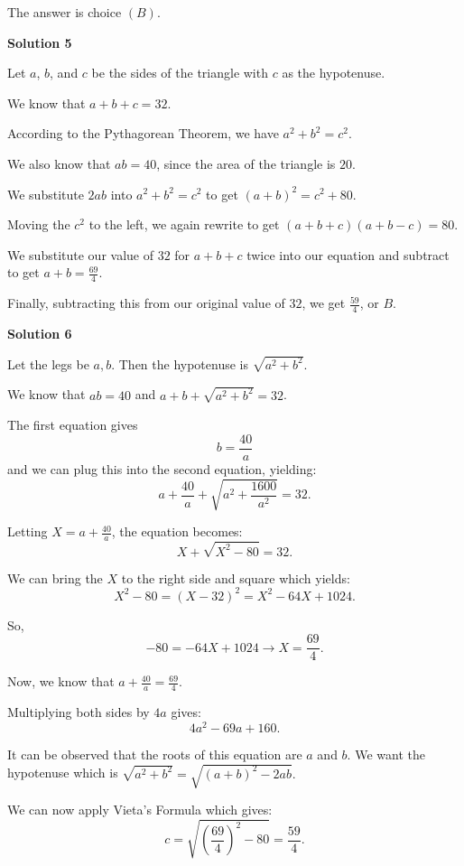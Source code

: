 \begin{enumerate}
 The answer is choice $(B)$.

 



\textbf{Solution 5}

Let $a$, $b$, and $c$ be the sides of the triangle with $c$ as the hypotenuse.

 We know that $a + b + c =32$.

 According to the Pythagorean Theorem, we have $a^2 + b^2 = c^2$.

 We also know that $ab = 40$, since the area of the triangle is $20$.

 We substitute $2ab$ into $a^2 + b^2 = c^2$ to get $(a+b)^2 = c^2 + 80$.

 Moving the $c^2$ to the left, we again rewrite to get $(a+b+c)(a+b-c) = 80$.

 We substitute our value of $32$ for $a+b+c$ twice into our equation and subtract to get $a + b = \frac{69}{4}$.

 Finally, subtracting this from our original value of $32$, we get $\frac{59}{4}$, or $B$.

 



\textbf{Solution 6}

Let the legs be $a, b$. Then the hypotenuse is $\sqrt{a^2 + b^2}.$

 We know that $ab = 40$ and $a + b + \sqrt{a^2 + b^2} = 32$.

 The first equation gives 
 \[b = \frac{40}{a}\] and we can plug this into the second equation, yielding: 
 \[a + \frac{40}{a} + \sqrt{ a^2 + \frac{1600}{a^2}} = 32.\]

 Letting $X = a + \frac{40}{a}$, the equation becomes: 
 \[X + \sqrt{X^2 - 80} = 32.\]

 We can bring the $X$ to the right side and square which yields: 
 \[X^2 - 80 = (X - 32)^2 = X^2 - 64X + 1024.\]

 So, 
 \[-80 = -64X + 1024 \rightarrow X = \frac{69}{4}.\]

 Now, we know that $a + \frac{40}{a} = \frac{69}{4}.$

 Multiplying both sides by $4a$ gives: 
 \[4a^2 - 69a + 160.\]

 It can be observed that the roots of this equation are $a$ and $b$. We want the hypotenuse which is $\sqrt{a^2 + b^2} = \sqrt{ (a+b)^2 - 2ab}.$

 We can now apply Vieta's Formula which gives: 
 \[c = \sqrt{ \left( \frac{69}{4} \right)^2 - 80} = \boxed{ \frac{59}{4}}.\]





\end{enumerate}

